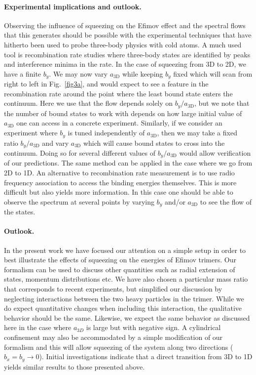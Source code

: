 \documentclass[twocolumn,showpacs,aps,prl,10pt]{revtex4}
\begin{document}
\paragraph*{Experimental implications and outlook.}  
Observing the influence of squeezing on the Efimov effect and the
spectral flows that this generates should be possible with the
experimental techniques that have hitherto been used to probe
three-body physics with cold atoms. A much used tool is recombination
rate studies where three-body states are identified by peaks and
interference minima in the rate.  In the case of squeezing from 3D to
2D, we have a finite $b_y$. We may now vary $a_\textrm{3D}$ while
keeping $b_y$ fixed which will scan from right to left in Fig.~\ref{fig3a},
and would expect to see a feature in the recombination rate around the
point where the least bound state enters the continuum. Here we use
that the flow depends solely on $b_y/a_\textrm{3D}$, but we note that
the number of bound states to work with depends on how large initial
value of $a_\textrm{3D}$ one can access in a concrete
experiment. Similarly, if we consider an experiment where $b_y$ is
tuned independently of $a_\textrm{3D}$, then we may take a fixed ratio
$b_y/a_\textrm{3D}$ and vary $a_\textrm{3D}$ which will cause bound
states to cross into the continuum. Doing so for several different
values of $b_y/a_\textrm{3D}$ would allow verification of our
predictions. The same method can be applied in the case where we go
from 2D to 1D.  An alternative to recombination rate measurement is to
use radio frequency association \cite{lompe2010,nakajima2010} to access the binding
energies themselves. This is more difficult but also yields more
information. In this case one should be able to observe the spectrum
at several points by varying $b_y$ and/or $a_\textrm{3D}$ to see the
flow of the states.


\paragraph*{Outlook.}  
In the present work we have focused our attention on a simple setup 
in order to best illustrate the effects of squeezing on the energies of Efimov 
trimers. Our formalism can be used to 
discuss other quantities such as radial extension of states, 
momentum distributions etc. We have also chosen a particular 
mass ratio that corresponds to recent experiments, but simplified
our discussion by neglecting interactions between the two heavy
particles in the trimer. While we do expect quantitative changes
when including this interaction, the qualitative behavior should 
be the same. Likewise, we expect the same behavior as discussed
here in the case where $a_{3D}$ is large but with negative sign.  
A cylindrical confinement may also be accommodated by a simple 
modification of our formalism and this will allow squeezing 
of the system along two directions ($b_x=b_y\to 0$). Initial 
investigations indicate that a direct transition from 3D to 1D
yields similar results to those presented above.
\end{document}
